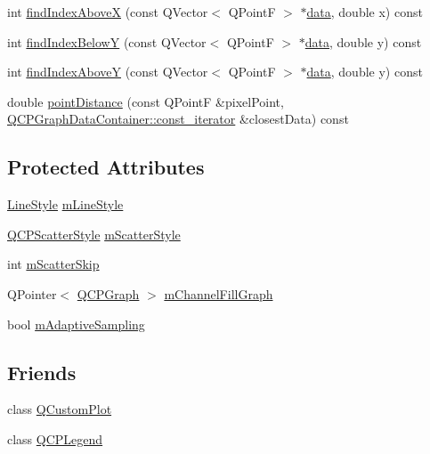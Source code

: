 \begin{DoxyCompactItemize}
int \hyperlink{class_q_c_p_graph_aaabd6c6a7200a2672c44e62bd2a1cafa}{find\+Index\+AboveX} (const Q\+Vector$<$ Q\+PointF $>$ $\ast$\hyperlink{class_q_c_p_graph_a141aa31a1f19bbd0ce60f55eaeb9ea60}{data}, double x) const
\item 
int \hyperlink{class_q_c_p_graph_a5b0291f248e8ca8eaa82833ab420dcd0}{find\+Index\+BelowY} (const Q\+Vector$<$ Q\+PointF $>$ $\ast$\hyperlink{class_q_c_p_graph_a141aa31a1f19bbd0ce60f55eaeb9ea60}{data}, double y) const
\item 
int \hyperlink{class_q_c_p_graph_a8b952a5f937840dc242489585cc8000d}{find\+Index\+AboveY} (const Q\+Vector$<$ Q\+PointF $>$ $\ast$\hyperlink{class_q_c_p_graph_a141aa31a1f19bbd0ce60f55eaeb9ea60}{data}, double y) const
\item 
double \hyperlink{class_q_c_p_graph_a89acf99c0b52b8eecb2438adf7ec0170}{point\+Distance} (const Q\+PointF \&pixel\+Point, \hyperlink{class_q_c_p_data_container_ae40a91f5cb0bcac61d727427449b7d15}{Q\+C\+P\+Graph\+Data\+Container\+::const\+\_\+iterator} \&closest\+Data) const
\end{DoxyCompactItemize}
\subsection*{Protected Attributes}
\begin{DoxyCompactItemize}
\item 
\hyperlink{class_q_c_p_graph_ad60175cd9b5cac937c5ee685c32c0859}{Line\+Style} \hyperlink{class_q_c_p_graph_a8604fd98402035a63375849f7341ee25}{m\+Line\+Style}
\item 
\hyperlink{class_q_c_p_scatter_style}{Q\+C\+P\+Scatter\+Style} \hyperlink{class_q_c_p_graph_a4aa36241f166ccd1f75fc8f24e4a3247}{m\+Scatter\+Style}
\item 
int \hyperlink{class_q_c_p_graph_a4ca1e50fbfe8307022b42a6f6178fae0}{m\+Scatter\+Skip}
\item 
Q\+Pointer$<$ \hyperlink{class_q_c_p_graph}{Q\+C\+P\+Graph} $>$ \hyperlink{class_q_c_p_graph_a2f1777c7accf8244fc640c33f0b04577}{m\+Channel\+Fill\+Graph}
\item 
bool \hyperlink{class_q_c_p_graph_aa951e78aeba714cf443be6da2e52502e}{m\+Adaptive\+Sampling}
\end{DoxyCompactItemize}
\subsection*{Friends}
\begin{DoxyCompactItemize}
\item 
class \hyperlink{class_q_c_p_graph_a1cdf9df76adcfae45261690aa0ca2198}{Q\+Custom\+Plot}
\item 
class \hyperlink{class_q_c_p_graph_a8429035e7adfbd7f05805a6530ad5e3b}{Q\+C\+P\+Legend}
\end{DoxyCompactItemize}

